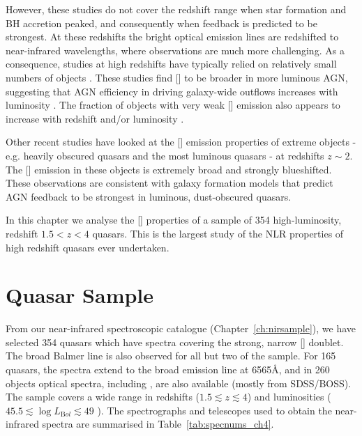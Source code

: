 However, these studies do not cover the redshift range when star formation and BH accretion peaked, and consequently when feedback is predicted to be strongest. 
At these redshifts the bright optical emission lines are redshifted to near-infrared wavelengths, where observations are much more challenging. 
As a consequence, studies at high redshifts have typically relied on relatively small numbers of objects \citep[e.g.][]{netzer04,sulentic04,shen16a}.
These studies find [] to be broader in more luminous AGN, suggesting that AGN efficiency in driving galaxy-wide outflows increases with luminosity \citep[e.g.][]{netzer04,nesvadba08,kim13,brusa15,carniani15,perna15,bischetti16}. 
The fraction of objects with very weak [] emission also appears to increase with redshift and/or luminosity \citep[e.g.][]{netzer04}. 

Other recent studies have looked at the [] emission properties of extreme objects - e.g. heavily obscured quasars \citep{zakamska16} and the most luminous quasars \citep{bischetti16} - at redshifts $z\sim2$. 
The [] emission in these objects is extremely broad and strongly blueshifted. 
These observations are consistent with galaxy formation models that predict AGN feedback to be strongest in luminous, dust-obscured quasars.

In this chapter we analyse the [] properties of a sample of 354 high-luminosity, redshift $1.5 < z < 4$ quasars.
This is the largest study of the NLR properties of high redshift quasars ever undertaken. 

\section{Quasar Sample}

From our near-infrared spectroscopic catalogue (Chapter~\ref{ch:nirsample}), we have selected 354 quasars which have spectra covering the strong, narrow [] doublet. 
The broad Balmer \hb line is also observed for all but two of the sample. 
For 165 quasars, the spectra extend to the broad \ha emission line at 6565\AA, and in 260 objects optical spectra, including , are also available (mostly from SDSS/BOSS). 
The sample covers a wide range in redshifts ($1.5 \lesssim z \lesssim 4$) and luminosities ($45.5 \lesssim \log L_{\mathrm Bol} \lesssim 49$ \ergs). 
The spectrographs and telescopes used to obtain the near-infrared spectra are summarised in Table~\ref{tab:specnums_ch4}.

